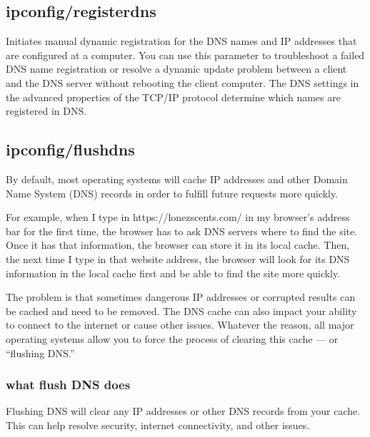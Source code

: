 \documentclass[a4paper,12pt]{book}
\begin{document}

\subsection{ipconfig/registerdns}
Initiates manual dynamic registration for the DNS names and IP addresses that are configured at a computer. You can use this parameter to troubleshoot a failed DNS name registration or resolve a dynamic update problem between a client and the DNS server without rebooting the client computer. The DNS settings in the advanced properties of the TCP/IP protocol determine which names are registered in DNS.

\subsection{ipconfig/flushdns}

By default, most operating systems will cache IP addresses and other Domain Name System (DNS) records in order to fulfill future requests more quickly.

For example, when I type in https://lonezscents.com/ in my browser’s address bar for the first time, the browser has to ask DNS servers where to find the site. Once it has that information, the browser can store it in its local cache. Then, the next time I type in that website address, the browser will look for its DNS information in the local cache first and be able to find the site more quickly.

The problem is that sometimes dangerous IP addresses or corrupted results can be cached and need to be removed. The DNS cache can also impact your ability to connect to the internet or cause other issues. Whatever the reason, all major operating systems allow you to force the process of clearing this cache — or “flushing DNS.”

\subsubsection{what flush DNS does}
Flushing DNS will clear any IP addresses or other DNS records from your cache. This can help resolve security, internet connectivity, and other issues.
\end{document}
